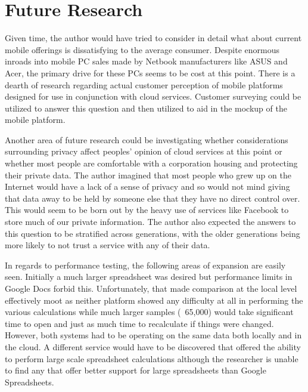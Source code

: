 \section{Future Research}



Given time, the author would have tried to consider in detail what about current
mobile offerings is dissatisfying to the average consumer.  Despite enormous
inroads into mobile PC sales made by Netbook manufacturers like ASUS and Acer,
the primary drive for these PCs seems to be cost at this
point\citep{gladstone09}.  There is a dearth of research regarding actual
customer perception of mobile platforms designed for use in conjunction with
cloud services.  Customer surveying could be utilized to answer this question
and then utilized to aid in the mockup of the mobile platform.

Another area of future research could be investigating whether considerations
surrounding privacy affect peoples' opinion of cloud services at this point or
whether most people are comfortable with a corporation housing and protecting
their private data.  The author imagined that most people who grew up on the
Internet would have a lack of a sense of privacy and so would not mind giving
that data away to be held by someone else that they have no direct control over.
This would seem to be born out by the heavy use of services like Facebook to
store much of our private information.  The author also expected the answers to
this question to be stratified across generations, with the older generations
being more likely to not trust a service with any of their data.


In regards to performance testing, the following areas of expansion are easily
seen.  Initially a much larger spreadsheet was desired but performance limits in
Google Docs forbid this.  Unfortunately, that made comparison at the local level
effectively moot as neither platform showed any difficulty at all in performing
the various calculations while much larger samples (~65,000) would take
significant time to open and just as much time to recalculate if things were
changed.  However, both systems had to be operating on the same data both
locally and in the cloud.  A different service would have to be discovered that
offered the ability to perform large scale spreadsheet calculations although the
researcher is unable to find any that offer better support for large
spreadsheets than Google Spreadsheets.
